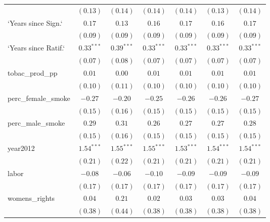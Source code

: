 \begin{table}[!h]
\begin{center}
\begin{tabular}{l c c c c c c }
                        & $(0.13)$     & $(0.14)$     & $(0.14)$     & $(0.14)$     & $(0.13)$     & $(0.14)$     \\
`Years since Sign.`     & $0.17$       & $0.13$       & $0.16$       & $0.17$       & $0.16$       & $0.17$       \\
                        & $(0.09)$     & $(0.09)$     & $(0.09)$     & $(0.09)$     & $(0.09)$     & $(0.09)$     \\
`Years since Ratif.`    & $0.33^{***}$ & $0.39^{***}$ & $0.33^{***}$ & $0.33^{***}$ & $0.33^{***}$ & $0.33^{***}$ \\
                        & $(0.07)$     & $(0.08)$     & $(0.07)$     & $(0.07)$     & $(0.07)$     & $(0.07)$     \\
tobac\_prod\_pp         & $0.01$       & $0.00$       & $0.01$       & $0.01$       & $0.01$       & $0.01$       \\
                        & $(0.10)$     & $(0.11)$     & $(0.10)$     & $(0.10)$     & $(0.10)$     & $(0.10)$     \\
perc\_female\_smoke     & $-0.27$      & $-0.20$      & $-0.25$      & $-0.26$      & $-0.26$      & $-0.27$      \\
                        & $(0.15)$     & $(0.16)$     & $(0.15)$     & $(0.15)$     & $(0.15)$     & $(0.15)$     \\
perc\_male\_smoke       & $0.29$       & $0.31$       & $0.26$       & $0.27$       & $0.27$       & $0.28$       \\
                        & $(0.15)$     & $(0.16)$     & $(0.15)$     & $(0.15)$     & $(0.15)$     & $(0.15)$     \\
year2012                & $1.54^{***}$ & $1.55^{***}$ & $1.55^{***}$ & $1.53^{***}$ & $1.54^{***}$ & $1.54^{***}$ \\
                        & $(0.21)$     & $(0.22)$     & $(0.21)$     & $(0.21)$     & $(0.21)$     & $(0.21)$     \\
labor                   & $-0.08$      & $-0.06$      & $-0.10$      & $-0.09$      & $-0.09$      & $-0.09$      \\
                        & $(0.17)$     & $(0.17)$     & $(0.17)$     & $(0.17)$     & $(0.17)$     & $(0.17)$     \\
womens\_rights          & $0.04$       & $0.21$       & $0.02$       & $0.03$       & $0.03$       & $0.04$       \\
                        & $(0.38)$     & $(0.44)$     & $(0.38)$     & $(0.38)$     & $(0.38)$     & $(0.38)$     \\

\end{tabular}
\end{center}
\end{table}
